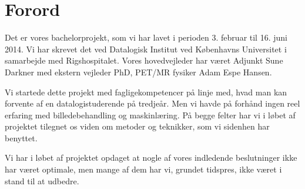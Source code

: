 \section{Forord}

Det er vores bachelorprojekt, som vi har lavet i perioden 3. februar til 16.
juni 2014. Vi har skrevet det ved Datalogisk Institut ved Københavns Universitet
i samarbejde med Rigshospitalet. Vores hovedvejleder har været Adjunkt Sune
Darkner med ekstern vejleder PhD, PET/MR fysiker Adam Espe Hansen.

Vi startede dette projekt med fagligekompetencer på linje med, hvad man
kan forvente af en datalogistuderende på tredjeår. Men vi havde på forhånd
ingen reel erfaring med billedebehandling og maskinlæring. På begge felter
har vi i løbet af projektet tilegnet os viden om metoder og teknikker, som
vi sidenhen har benyttet. 

Vi har i løbet af projektet opdaget at nogle af vores indledende
beslutninger ikke har været optimale, men mange af dem har vi, grundet
tidspres, ikke været i stand til at udbedre.
